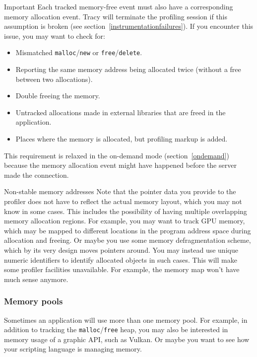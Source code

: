 \documentclass[hidelinks,titlepage,a4paper,twoside]{article}
\begin{document}
\begin{bclogo}[
noborder=true,
couleur=black!5,
logo=\bcbombe
]{Important}
Each tracked memory-free event must also have a corresponding memory allocation event. Tracy will terminate the profiling session if this assumption is broken (see section~\ref{instrumentationfailures}). If you encounter this issue, you may want to check for:

\begin{itemize}
\item Mismatched \texttt{malloc}/\texttt{new} or \texttt{free}/\texttt{delete}.
\item Reporting the same memory address being allocated twice (without a free between two allocations).
\item Double freeing the memory.
\item Untracked allocations made in external libraries that are freed in the application.
\item Places where the memory is allocated, but profiling markup is added.
\end{itemize}

This requirement is relaxed in the on-demand mode (section~\ref{ondemand}) because the memory allocation event might have happened before the server made the connection.
\end{bclogo}

\begin{bclogo}[
noborder=true,
couleur=black!5,
logo=\bclampe
]{Non-stable memory addresses}
Note that the pointer data you provide to the profiler does not have to reflect the actual memory layout, which you may not know in some cases. This includes the possibility of having multiple overlapping memory allocation regions. For example, you may want to track GPU memory, which may be mapped to different locations in the program address space during allocation and freeing. Or maybe you use some memory defragmentation scheme, which by its very design moves pointers around. You may instead use unique numeric identifiers to identify allocated objects in such cases. This will make some profiler facilities unavailable. For example, the memory map won't have much sense anymore.
\end{bclogo}

\subsubsection{Memory pools}
\label{memorypools}

Sometimes an application will use more than one memory pool. For example, in addition to tracking the \texttt{malloc}/\texttt{free} heap, you may also be interested in memory usage of a graphic API, such as Vulkan. Or maybe you want to see how your scripting language is managing memory.
\end{document}
